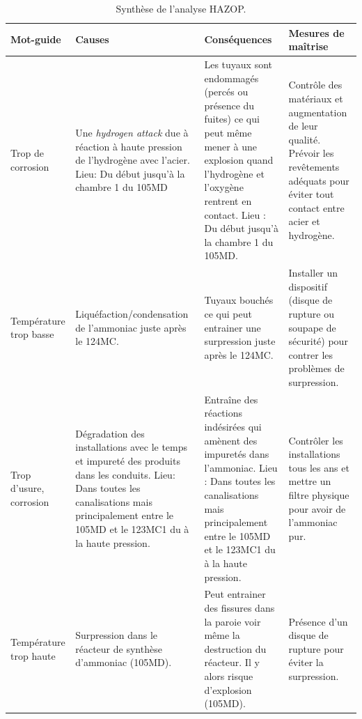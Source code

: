 	\begin{table}[ht!]
		\centering
		{
			\begin{tabular}{|p{0.25\textwidth}|p{}|p{}|p{}|}
				\rowcolor{Gray} Mot-guide		& Causes 	& Conséquences 	&	Mesures de maîtrise 	\\
				\hline
				Trop de corrosion		 
				& Une \textit{hydrogen attack} due à réaction à haute pression 
				de l'hydrogène avec l'acier. Lieu: Du début jusqu'à la chambre 1 du 105MD
				& Les tuyaux sont endommagés (percés ou présence du fuites) ce qui peut
				même mener à une explosion quand l'hydrogène et l'oxygène rentrent en contact. 
				Lieu : Du début jusqu'à la chambre 1 du 105MD.	 
				& Contrôle des matériaux	et augmentation de leur qualité. Prévoir les revêtements adéquats pour éviter tout contact entre acier et hydrogène. 	\\				
				\hline
				Température	trop basse	
				& Liquéfaction/condensation de l'ammoniac juste après le 124MC.	
				& Tuyaux bouchés ce qui peut entrainer une surpression juste après le 124MC.  
				& Installer un dispositif (disque de rupture ou soupape de sécurité) pour contrer
					les problèmes de surpression. \\
				\hline 
				Trop d'usure, corrosion	
				& Dégradation des installations avec le temps et impureté des produits 
				dans les conduits. Lieu: Dans toutes les canalisations mais principalement entre 
				le 105MD et le 123MC1 du à la haute pression.	
				& Entraîne des réactions indésirées qui amènent des impuretés dans l'ammoniac. 
				Lieu : Dans toutes les canalisations mais principalement entre le 105MD et le 123MC1 
				du à la haute pression.	 
				&  Contrôler les installations tous les ans et mettre un filtre physique pour avoir de l'ammoniac pur.	\\
				\hline
				Température trop haute	
				&	Surpression dans le réacteur de synthèse d'ammoniac (105MD).				
				& Peut entrainer des fissures dans la paroie voir même la destruction du réacteur. 
				Il y alors risque d'explosion (105MD).							
				& Présence d'un disque de rupture pour éviter la surpression. \\
				\hline
			\end{tabular}
		}
		\caption{Synthèse de l'analyse HAZOP.}
	\end{table}

\newpage
{}


